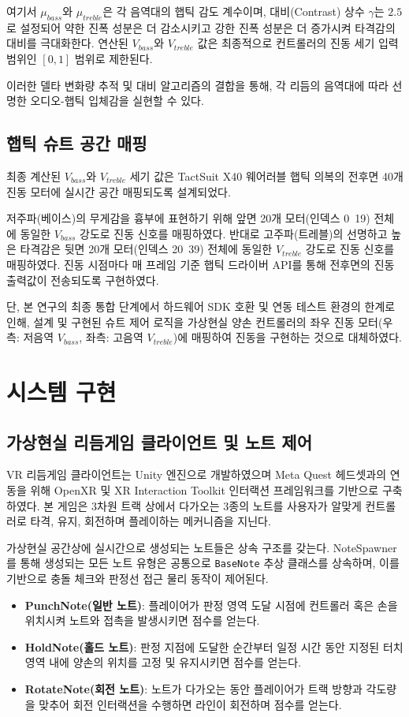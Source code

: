 \documentclass{kcc}
\begin{document}
여기서 $\mu_{bass}$와 $\mu_{treble}$은 각 음역대의 햅틱 감도 계수이며, 대비(Contrast) 상수 $\gamma$는 $2.5$로 설정되어 약한 진폭 성분은 더 감소시키고 강한 진폭 성분은 더 증가시켜 타격감의 대비를 극대화한다. 연산된 $V_{bass}$와 $V_{treble}$ 값은 최종적으로 컨트롤러의 진동 세기 입력 범위인 $[0, 1]$ 범위로 제한된다.

이러한 델타 변화량 추적 및 대비 알고리즘의 결합을 통해, 각 리듬의 음역대에 따라 선명한 오디오-햅틱 입체감을 실현할 수 있다.

\subsection{햅틱 슈트 공간 매핑}
최종 계산된 $V_{bass}$와 $V_{treble}$ 세기 값은 TactSuit X40 웨어러블 햅틱 의복의 전후면 40개 진동 모터에 실시간 공간 매핑되도록 설계되었다. 

저주파(베이스)의 무게감을 흉부에 표현하기 위해 앞면 20개 모터(인덱스 0~19) 전체에 동일한 $V_{bass}$ 강도로 진동 신호를 매핑하였다. 반대로 고주파(트레블)의 선명하고 높은 타격감은 뒷면 20개 모터(인덱스 20~39) 전체에 동일한 $V_{treble}$ 강도로 진동 신호를 매핑하였다. 진동 시점마다 매 프레임 기준 햅틱 드라이버 API를 통해 전후면의 진동 출력값이 전송되도록 구현하였다.

단, 본 연구의 최종 통합 단계에서 하드웨어 SDK 호환 및 연동 테스트 환경의 한계로 인해, 설계 및 구현된 슈트 제어 로직을 가상현실 양손 컨트롤러의 좌우 진동 모터(우측: 저음역 $V_{bass}$, 좌측: 고음역 $V_{treble}$)에 매핑하여 진동을 구현하는 것으로 대체하였다.

\section{시스템 구현}
\subsection{가상현실 리듬게임 클라이언트 및 노트 제어}
VR 리듬게임 클라이언트는 Unity 엔진으로 개발하였으며 Meta Quest 헤드셋과의 연동을 위해 OpenXR 및 XR Interaction Toolkit 인터랙션 프레임워크를 기반으로 구축하였다. 본 게임은 3차원 트랙 상에서 다가오는 3종의 노트를 사용자가 알맞게 컨트롤러로 타격, 유지, 회전하며 플레이하는 메커니즘을 지닌다.

가상현실 공간상에 실시간으로 생성되는 노트들은 상속 구조를 갖는다. NoteSpawner를 통해 생성되는 모든 노트 유형은 공통으로 \texttt{BaseNote} 추상 클래스를 상속하며, 이를 기반으로 충돌 체크와 판정선 접근 물리 동작이 제어된다.

\begin{itemize}[itemsep=0pt,parsep=0pt]
  \item \textbf{PunchNote(일반 노트)}: 플레이어가 판정 영역 도달 시점에 컨트롤러 혹은 손을 위치시켜 노트와 접촉을 발생시키면 점수를 얻는다.
  \item \textbf{HoldNote(홀드 노트)}: 판정 지점에 도달한 순간부터 일정 시간 동안 지정된 터치 영역 내에 양손의 위치를 고정 및 유지시키면 점수를 얻는다.
  \item \textbf{RotateNote(회전 노트)}: 노트가 다가오는 동안 플레이어가 트랙 방향과 각도량을 맞추어 회전 인터랙션을 수행하면 라인이 회전하며 점수를 얻는다.
\end{itemize}
\end{document}
